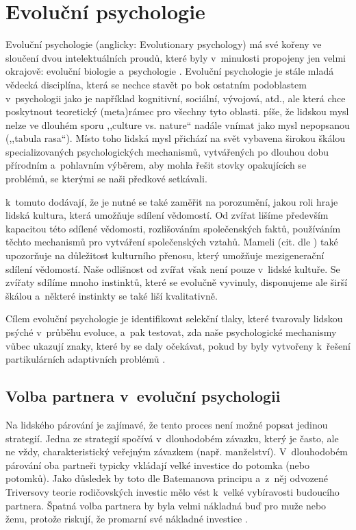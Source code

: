 \documentclass[a4paper, 12pt, notitlepage, oneside, numbers=noenddot]{report}
\begin{document}
\section{Evoluční psychologie}
Evoluční psychologie (anglicky: Evolutionary psychology) má své kořeny
ve sloučení dvou intelektuálních proudů, které byly v~minulosti
propojeny jen velmi okrajově: evoluční biologie a~psychologie
\citep{DunbarBarrett2009}.  Evoluční psychologie je stále mladá
vědecká disciplína, která se nechce stavět po bok ostatním podoblastem
v~psychologii jako je například kognitivní, sociální, vývojová, atd.,
ale která chce poskytnout teoretický (meta)rámec pro všechny tyto
oblasti.  \citet{Handbook2005} píše, že lidskou mysl nelze
ve dlouhém sporu ,,culture vs. nature`` nadále vnímat jako mysl
nepopsanou (,,tabula rasa``).  Místo toho lidská mysl přichází na svět
vybavena širokou škálou specializovaných psychologických mechanismů,
vytvářených po dlouhou dobu přírodním a~pohlavním vý\-běr\-em, aby mohla
řešit stovky opakujících se problémů, se kterými se naši předkové
setkávali.

\citet{DunbarBarrett2009} k~tomuto dodávají, že je nutné se také
zaměřit na porozumění, jakou roli hraje lidská kultura, která umožňuje
sdílení vědomostí.  Od zvířat lišíme především kapacitou této sdílené
vědomosti, rozlišováním společenských faktů, používáním těchto
mechanismů pro vytváření společenských vztahů.  Mameli (cit. dle
\citealp{DunbarBarrett2009}) také upozorňuje na důležitost kulturního
přenosu, který u\-mo\-žňu\-je mezigenerační sdílení vědomostí.  Naše
odlišnost od zvířat však není pouze v~lidské kultuře.  Se zvířaty
sdílíme mnoho instinktů, které se evolučně vyvinuly, disponujeme ale
širší škálou a~některé instinkty se také liší kvalitativně.

Cílem evoluční psychologie je identifikovat selekční tlaky, které
tvarovaly lidskou psýché v~průběhu evoluce, a~pak testovat, zda naše
psychologické mechanismy vůbec ukazují znaky, které by se daly
očekávat, pokud by byly vytvořeny k~řešení partikulárních adaptivních
problémů \citep{BarrettDunbarLycett2007}.

\subsection{Volba partnera v~evoluční psychologii}

Na lidského párování je zajímavé, že tento proces není možné popsat
jedinou strategií.  Jedna ze strategií spočívá v~dlouhodobém závazku,
který je často, ale ne vždy, charakteristický veřejným závazkem
(např. manželství).  V~dlou\-ho\-do\-bém párování oba partneři typicky
vkládají velké investice do potomka (nebo potomků).  Jako důsledek by
toto dle Batemanova principu a~z~něj odvozené Triversovy teorie
rodičovských investic mělo vést k~velké vybíravosti budoucího
partnera.  Špatná volba partnera by byla velmi nákladná buď pro muže
nebo ženu, protože riskují, že promarní své nákladné investice
\citep{Buss2007}.
\end{document}
